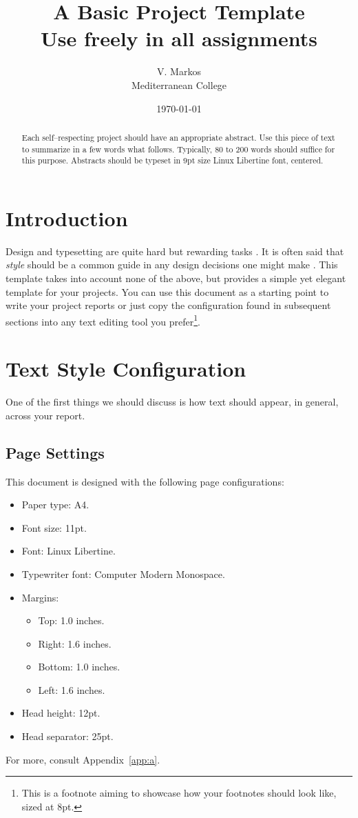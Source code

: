 \documentclass[a4paper, 11pt]{article}
\title{A Basic Project Template\\{\normalsize Use freely in all assignments}}
\author{V. Markos\\{\normalsize Mediterranean College}}
\date{\today}
\numberwithin{equation}{section}
\theoremstyle{definition}
\begin{document}
	\maketitle
	\begin{abstract}
		Each self--respecting project should have an appropriate abstract. Use this piece of text to summarize in a few words what follows. Typically, 80 to 200 words should suffice for this purpose. Abstracts should be typeset in 9pt size Linux Libertine font, centered.
	\end{abstract}
	\section{Introduction}
	Design and typesetting are quite hard but rewarding tasks \cite{Lupton2024-ik}. It is often said that \emph{style} should be a common guide in any design decisions one might make \cite{tufte2001}. This template takes into account none of the above, but provides a simple yet elegant template for your projects. You can use this document as a starting point to write your project reports or just copy the configuration found in subsequent sections into any text editing tool you prefer\footnote{This is a footnote aiming to showcase how your footnotes should look like, sized at 8pt.}.
    \section{Text Style Configuration}\label{sec:Page Layout}
    One of the first things we should discuss is how text should appear, in general, across your report.
    \subsection{Page Settings}\label{subsec:Page Settings}
    This document is designed with the following page configurations:
    \begin{itemize}
    	\item Paper type: A4.
    	\item Font size: 11pt.
    	\item Font: Linux Libertine.
    	\item Typewriter font: Computer Modern Monospace.
    	\item Margins:
    	\begin{itemize}
    		\item Top: 1.0 inches.
	    	\item Right: 1.6 inches.
	    	\item Bottom: 1.0 inches.
       		\item Left: 1.6 inches.
    	\end{itemize}
    	\item Head height: 12pt.
    	\item Head separator: 25pt.
    \end{itemize}
	For more, consult Appendix~\ref{app:a}.
\end{document}
